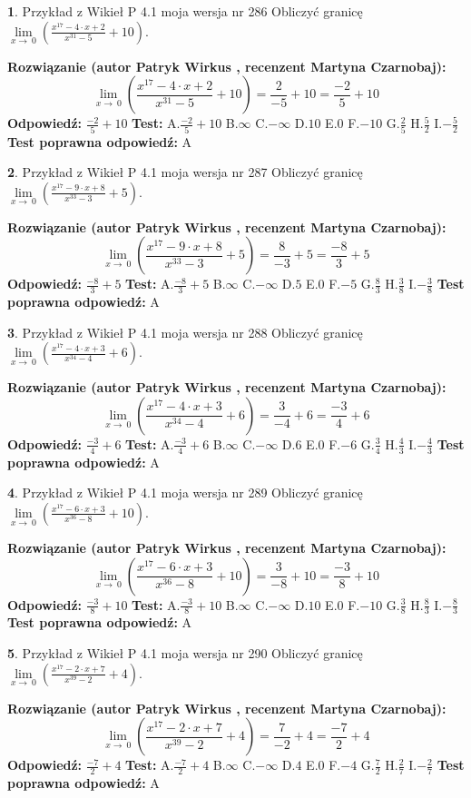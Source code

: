 \documentclass[12pt, a4paper]{article}
\theoremstyle{definition} %
\newtheorem{zad}{}
\newcommand{\zadStart}[1]{\begin{zad}#1\newline}
\newcommand{\zadStop}{\end{zad}}
\newcommand{\rozwStart}[2]{\noindent \textbf{Rozwiązanie (autor #1 , recenzent #2): }\newline}
\newcommand{\rozwStop}{\newline}
\newcommand{\odpStart}{\noindent \textbf{Odpowiedź:}\newline}
\newcommand{\odpStop}{\newline}
\newcommand{\testStart}{\noindent \textbf{Test:}\newline}
\newcommand{\testStop}{\newline}
\newcommand{\kluczStart}{\noindent \textbf{Test poprawna odpowiedź:}\newline}
\newcommand{\kluczStop}{\newline}
\begin{document}
\zadStart{Przykład z Wikieł P 4.1 moja wersja nr 286}
Obliczyć granicę $\lim\limits_{x\to\ 0}(\frac{x^{17}-4 \cdot x +2}{x^{31}-5}+10)$.
\zadStop
\rozwStart{Patryk Wirkus}{Martyna Czarnobaj}
$$\lim\limits_{x\to\ 0}(\frac{x^{17}-4 \cdot x +2}{x^{31}-5}+10)=\frac{2}{-5}+10=\frac{-2}{5}+10$$
\rozwStop
\odpStart
$\frac{-2}{5}+10$
\odpStop
\testStart
A.$\frac{-2}{5}+10$
B.$\infty$
C.$-\infty$
D.$10$
E.$0$
F.$-10$
G.$\frac{2}{5}$
H.$\frac{5}{2}$
I.$-\frac{5}{2}$
\testStop
\kluczStart
A
\kluczStop



\zadStart{Przykład z Wikieł P 4.1 moja wersja nr 287}
Obliczyć granicę $\lim\limits_{x\to\ 0}(\frac{x^{17}-9 \cdot x +8}{x^{33}-3}+5)$.
\zadStop
\rozwStart{Patryk Wirkus}{Martyna Czarnobaj}
$$\lim\limits_{x\to\ 0}(\frac{x^{17}-9 \cdot x +8}{x^{33}-3}+5)=\frac{8}{-3}+5=\frac{-8}{3}+5$$
\rozwStop
\odpStart
$\frac{-8}{3}+5$
\odpStop
\testStart
A.$\frac{-8}{3}+5$
B.$\infty$
C.$-\infty$
D.$5$
E.$0$
F.$-5$
G.$\frac{8}{3}$
H.$\frac{3}{8}$
I.$-\frac{3}{8}$
\testStop
\kluczStart
A
\kluczStop



\zadStart{Przykład z Wikieł P 4.1 moja wersja nr 288}
Obliczyć granicę $\lim\limits_{x\to\ 0}(\frac{x^{17}-4 \cdot x +3}{x^{34}-4}+6)$.
\zadStop
\rozwStart{Patryk Wirkus}{Martyna Czarnobaj}
$$\lim\limits_{x\to\ 0}(\frac{x^{17}-4 \cdot x +3}{x^{34}-4}+6)=\frac{3}{-4}+6=\frac{-3}{4}+6$$
\rozwStop
\odpStart
$\frac{-3}{4}+6$
\odpStop
\testStart
A.$\frac{-3}{4}+6$
B.$\infty$
C.$-\infty$
D.$6$
E.$0$
F.$-6$
G.$\frac{3}{4}$
H.$\frac{4}{3}$
I.$-\frac{4}{3}$
\testStop
\kluczStart
A
\kluczStop



\zadStart{Przykład z Wikieł P 4.1 moja wersja nr 289}
Obliczyć granicę $\lim\limits_{x\to\ 0}(\frac{x^{17}-6 \cdot x +3}{x^{36}-8}+10)$.
\zadStop
\rozwStart{Patryk Wirkus}{Martyna Czarnobaj}
$$\lim\limits_{x\to\ 0}(\frac{x^{17}-6 \cdot x +3}{x^{36}-8}+10)=\frac{3}{-8}+10=\frac{-3}{8}+10$$
\rozwStop
\odpStart
$\frac{-3}{8}+10$
\odpStop
\testStart
A.$\frac{-3}{8}+10$
B.$\infty$
C.$-\infty$
D.$10$
E.$0$
F.$-10$
G.$\frac{3}{8}$
H.$\frac{8}{3}$
I.$-\frac{8}{3}$
\testStop
\kluczStart
A
\kluczStop



\zadStart{Przykład z Wikieł P 4.1 moja wersja nr 290}
Obliczyć granicę $\lim\limits_{x\to\ 0}(\frac{x^{17}-2 \cdot x +7}{x^{39}-2}+4)$.
\zadStop
\rozwStart{Patryk Wirkus}{Martyna Czarnobaj}
$$\lim\limits_{x\to\ 0}(\frac{x^{17}-2 \cdot x +7}{x^{39}-2}+4)=\frac{7}{-2}+4=\frac{-7}{2}+4$$
\rozwStop
\odpStart
$\frac{-7}{2}+4$
\odpStop
\testStart
A.$\frac{-7}{2}+4$
B.$\infty$
C.$-\infty$
D.$4$
E.$0$
F.$-4$
G.$\frac{7}{2}$
H.$\frac{2}{7}$
I.$-\frac{2}{7}$
\testStop
\kluczStart
A
\kluczStop
\end{document}
